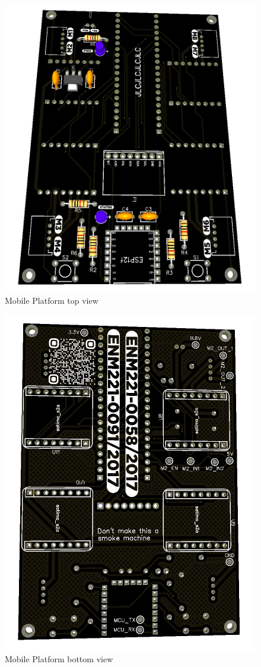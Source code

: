\begin{figure}[H]
    \centering
    \includegraphics[scale=0.5]{Figures/MPpcb_top.png}
    \caption{Mobile Platform top view}
    \label{fig:mobileplatformtopview}
\end{figure}

\begin{figure}[H]
    \centering
    \includegraphics[scale=0.5]{Figures/MPpcb_bottom.png}
    \caption{Mobile Platform bottom view}
    \label{fig:mobileplatformbottomview}
\end{figure}



